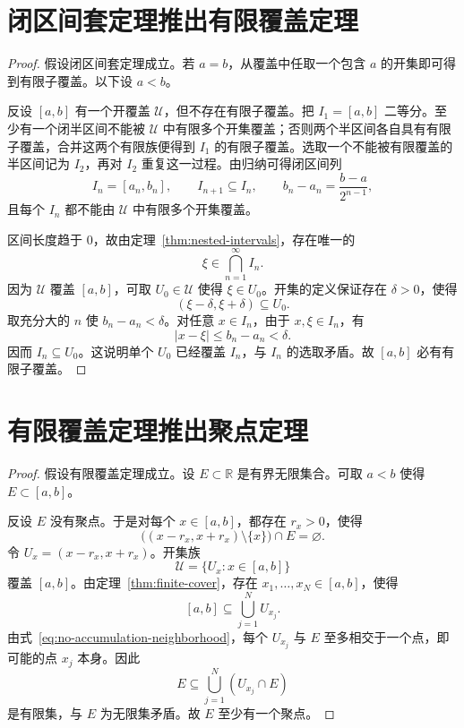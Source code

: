\documentclass[UTF8,12pt,a4paper,fontset=fandol]{ctexart}
\begin{document}
\section{闭区间套定理推出有限覆盖定理}

\begin{proof}
  假设闭区间套定理成立。若 $a=b$，从覆盖中任取一个包含 $a$ 的开集即可得到有限子覆盖。以下设 $a<b$。

  反设 $[a,b]$ 有一个开覆盖 $\mathcal U$，但不存在有限子覆盖。把 $I_1=[a,b]$ 二等分。至少有一个闭半区间不能被 $\mathcal U$ 中有限多个开集覆盖；否则两个半区间各自具有有限子覆盖，合并这两个有限族便得到 $I_1$ 的有限子覆盖。选取一个不能被有限覆盖的半区间记为 $I_2$，再对 $I_2$ 重复这一过程。由归纳可得闭区间列
  \[
    I_n=[a_n,b_n],
    \qquad
    I_{n+1}\subseteq I_n,
    \qquad
    b_n-a_n=\frac{b-a}{2^{n-1}},
  \]
  且每个 $I_n$ 都不能由 $\mathcal U$ 中有限多个开集覆盖。

  区间长度趋于 $0$，故由定理~\ref{thm:nested-intervals}，存在唯一的
  \[
    \xi\in\bigcap_{n=1}^{\infty}I_n.
  \]
  因为 $\mathcal U$ 覆盖 $[a,b]$，可取 $U_0\in\mathcal U$ 使得 $\xi\in U_0$。开集的定义保证存在 $\delta>0$，使得
  \[
    (\xi-\delta,\xi+\delta)\subseteq U_0.
  \]
  取充分大的 $n$ 使 $b_n-a_n<\delta$。对任意 $x\in I_n$，由于 $x,\xi\in I_n$，有
  \[
    |x-\xi|\leq b_n-a_n<\delta.
  \]
  因而 $I_n\subseteq U_0$。这说明单个 $U_0$ 已经覆盖 $I_n$，与 $I_n$ 的选取矛盾。故 $[a,b]$ 必有有限子覆盖。
\end{proof}

\section{有限覆盖定理推出聚点定理}

\begin{proof}
  假设有限覆盖定理成立。设 $E\subset\mathbb R$ 是有界无限集合。可取 $a<b$ 使得 $E\subset[a,b]$。

  反设 $E$ 没有聚点。于是对每个 $x\in[a,b]$，都存在 $r_x>0$，使得
  \begin{equation}
    \bigl((x-r_x,x+r_x)\setminus\{x\}\bigr)\cap E=\varnothing.
    \label{eq:no-accumulation-neighborhood}
  \end{equation}
  令 $U_x=(x-r_x,x+r_x)$。开集族
  \[
    \mathcal U=\{U_x:x\in[a,b]\}
  \]
  覆盖 $[a,b]$。由定理~\ref{thm:finite-cover}，存在 $x_1,\ldots,x_N\in[a,b]$，使得
  \[
    [a,b]\subseteq\bigcup_{j=1}^{N}U_{x_j}.
  \]
  由式~\eqref{eq:no-accumulation-neighborhood}，每个 $U_{x_j}$ 与 $E$ 至多相交于一个点，即可能的点 $x_j$ 本身。因此
  \[
    E\subseteq\bigcup_{j=1}^{N}(U_{x_j}\cap E)
  \]
  是有限集，与 $E$ 为无限集矛盾。故 $E$ 至少有一个聚点。
\end{proof}
\end{document}
